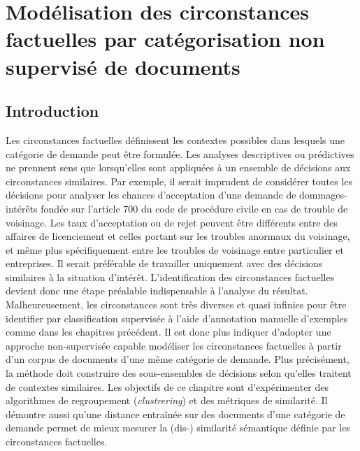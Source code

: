  \chapter{Modélisation des circonstances factuelles par catégorisation non supervisé de documents}
\label{chap:similarite}

% 

\section{Introduction}
\label{sec:similarite:introduction}
Les circonstances factuelles définissent les contextes possibles dans lesquels une catégorie de demande peut être formulée. Les analyses descriptives ou prédictives ne prennent sens que lorsqu'elles sont appliquées à un ensemble de décisions aux circonstances similaires. Par exemple, il serait imprudent de considérer toutes les décisions pour analyser les chances d'acceptation d'une demande de dommages-intérêts fondée sur l'\og article 700 du code de procédure civile \fg{} en cas de trouble de voisinage. Les taux d'acceptation ou de rejet peuvent être différents entre des affaires de licenciement et celles portant sur les troubles anormaux du voisinage, et même plus spécifiquement entre les troubles de voisinage entre particulier et entreprises. %
 Il serait préférable de travailler uniquement avec des décisions similaires à la situation d'intérêt. L'identification des circonstances factuelles devient donc une étape préalable indispensable à l'analyse du résultat. Malheureusement, les circonstances sont très diverses et quasi infinies pour être identifier par classification supervisée à l'aide d'annotation manuelle d'exemples comme dans les chapitres précédent. Il est donc plus indiquer d'adopter une approche non-supervisée capable modéliser les circonstances factuelles à partir d'un corpus de documents d'une même catégorie de demande. Plus précisément, la méthode doit construire des sous-ensembles de décisions selon qu'elles traitent de contextes similaires.  Les objectifs de ce chapitre sont d'expérimenter des algorithmes  de regroupement (\textit{clustrering}) et des métriques de similarité. Il démontre aussi qu'une distance entraînée  sur des documents d'une catégorie de demande permet de mieux mesurer la (dis-) similarité sémantique définie par les circonstances factuelles.

